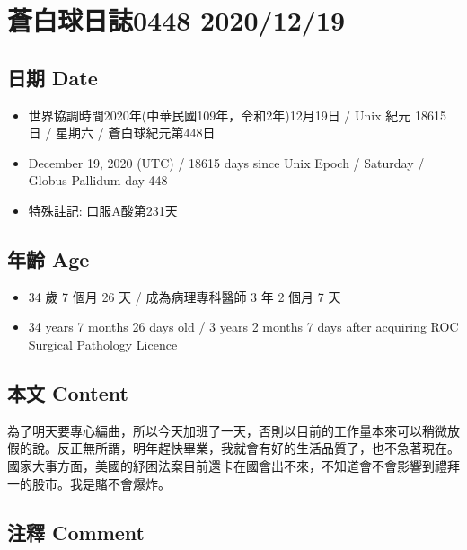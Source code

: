 \documentclass[a5paper, 10pt
]{book}
\providecommand{\tightlist}{%
  \setlength{\itemsep}{0pt}\setlength{\parskip}{0pt}}
\begin{document}
\hypertarget{ux84bcux767dux7403ux65e5ux8a8c0448-20201219}{%
\section{蒼白球日誌0448
2020/12/19}\label{ux84bcux767dux7403ux65e5ux8a8c0448-20201219}}

\hypertarget{ux65e5ux671f-date-18}{%
\subsection{日期 Date}\label{ux65e5ux671f-date-18}}

\begin{itemize}
\tightlist
\item
  世界協調時間2020年(中華民國109年，令和2年)12月19日 / Unix 紀元 18615
  日 / 星期六 / 蒼白球紀元第448日
\item
  December 19, 2020 (UTC) / 18615 days since Unix Epoch / Saturday /
  Globus Pallidum day 448
\item
  特殊註記: 口服A酸第231天
\end{itemize}

\hypertarget{ux5e74ux9f61-age-18}{%
\subsection{年齡 Age}\label{ux5e74ux9f61-age-18}}

\begin{itemize}
\tightlist
\item
  34 歲 7 個月 26 天 / 成為病理專科醫師 3 年 2 個月 7 天
\item
  34 years 7 months 26 days old / 3 years 2 months 7 days after
  acquiring ROC Surgical Pathology Licence
\end{itemize}

\hypertarget{ux672cux6587-content-18}{%
\subsection{本文 Content}\label{ux672cux6587-content-18}}

為了明天要專心編曲，所以今天加班了一天，否則以目前的工作量本來可以稍微放假的說。反正無所謂，明年趕快畢業，我就會有好的生活品質了，也不急著現在。國家大事方面，美國的紓困法案目前還卡在國會出不來，不知道會不會影響到禮拜一的股市。我是賭不會爆炸。

\hypertarget{ux6ce8ux91cb-comment-18}{%
\subsection{注釋 Comment}\label{ux6ce8ux91cb-comment-18}}
\end{document}
